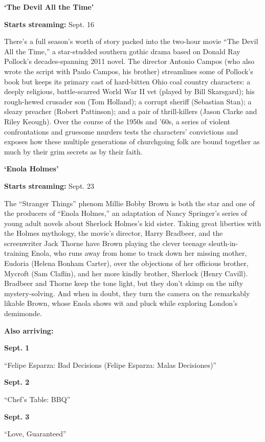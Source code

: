 \textbf{`The Devil All the Time'}

\textbf{Starts streaming:} Sept. 16

There's a full season's worth of story packed into the two-hour movie
``The Devil All the Time,'' a star-studded southern gothic drama based
on Donald Ray Pollock's decades-spanning 2011 novel. The director
Antonio Campos (who also wrote the script with Paulo Campos, his
brother) streamlines some of Pollock's book but keeps its primary cast
of hard-bitten Ohio coal country characters: a deeply religious,
battle-scarred World War II vet (played by Bill Skarsgard); his
rough-hewed crusader son (Tom Holland); a corrupt sheriff (Sebastian
Stan); a sleazy preacher (Robert Pattinson); and a pair of
thrill-killers (Jason Clarke and Riley Keough). Over the course of the
1950s and '60s, a series of violent confrontations and gruesome murders
tests the characters' convictions and exposes how these multiple
generations of churchgoing folk are bound together as much by their grim
secrets as by their faith.

\textbf{`Enola Holmes'}

\textbf{Starts streaming:} Sept. 23

The ``Stranger Things'' phenom Millie Bobby Brown is both the star and
one of the producers of ``Enola Holmes,'' an adaptation of Nancy
Springer's series of young adult novels about Sherlock Holmes's kid
sister. Taking great liberties with the Holmes mythology, the movie's
director, Harry Bradbeer, and the screenwriter Jack Thorne have Brown
playing the clever teenage sleuth-in-training Enola, who runs away from
home to track down her missing mother, Eudoria (Helena Bonham Carter),
over the objections of her officious brother, Mycroft (Sam Claflin), and
her more kindly brother, Sherlock (Henry Cavill). Bradbeer and Thorne
keep the tone light, but they don't skimp on the nifty mystery-solving.
And when in doubt, they turn the camera on the remarkably likable Brown,
whose Enola shows wit and pluck while exploring London's demimonde.

\textbf{Also arriving:}

\textbf{Sept. 1}

``Felipe Esparza: Bad Decisions (Felipe Esparza: Malas Decisiones)''

\textbf{Sept. 2}

``Chef's Table: BBQ''

\textbf{Sept. 3}

``Love, Guaranteed''

